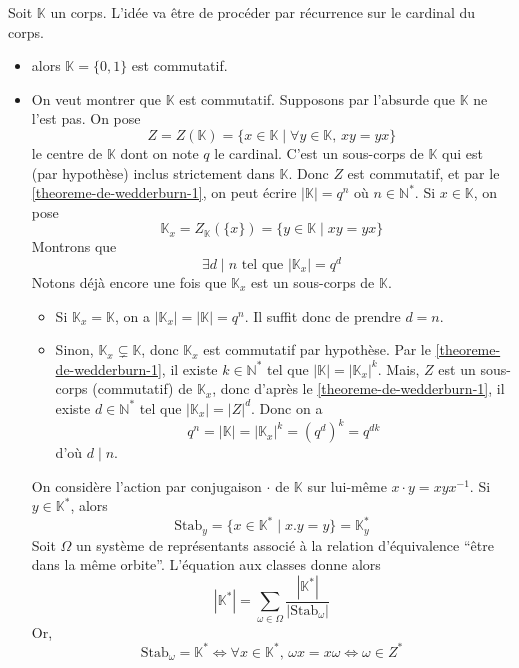 	\begin{demonstration}
		Soit $\mathbb{K}$ un corps. L'idée va être de procéder par récurrence sur le cardinal du corps.
		\begin{itemize}
			\item {} alors $\mathbb{K} = \{0, 1\}$ est commutatif.
			\item {} On veut montrer que $\mathbb{K}$ est commutatif. Supposons par l'absurde que $\mathbb{K}$ ne l'est pas. On pose
			\[ Z = Z(\mathbb{K}) = \{ x \in \mathbb{K} \mid \forall y \in \mathbb{K}, \, xy = yx \} \]
			le centre de $\mathbb{K}$ dont on note $q$ le cardinal. C'est un sous-corps de $\mathbb{K}$ qui est (par hypothèse) inclus strictement dans $\mathbb{K}$. Donc $Z$ est commutatif, et par le \cref{theoreme-de-wedderburn-1}, on peut écrire $|\mathbb{K}| = q^n$ où $n \in \mathbb{N}^*$. Si $x \in \mathbb{K}$, on pose
			\[ \mathbb{K}_x = Z_{\mathbb{K}}(\{ x \}) = \{ y \in \mathbb{K} \mid xy = yx \} \]
			Montrons que
			\[ \exists d \mid n \text{ tel que } |\mathbb{K}_x| = q^d \tag{$*$} \]
			Notons déjà encore une fois que $\mathbb{K}_x$ est un sous-corps de $\mathbb{K}$.
			\begin{itemize}
				\item Si $\mathbb{K}_x = \mathbb{K}$, on a $|\mathbb{K}_x| = |\mathbb{K}| = q^n$. Il suffit donc de prendre $d = n$.
				\item Sinon, $\mathbb{K}_x \subsetneq \mathbb{K}$, donc $\mathbb{K}_x$ est commutatif par hypothèse. Par le \cref{theoreme-de-wedderburn-1}, il existe $k \in \mathbb{N}^*$ tel que $|\mathbb{K}| = |\mathbb{K}_x|^k$.
				\newpar
				Mais, $Z$ est un sous-corps (commutatif) de $\mathbb{K}_x$, donc d'après le \cref{theoreme-de-wedderburn-1}, il existe $d \in \mathbb{N}^*$ tel que $|\mathbb{K}_x| = |Z|^d$. Donc on a
				\[ q^n = |\mathbb{K}| = |\mathbb{K}_x|^k = (q^d)^k = q^{dk} \]
				d'où $d \mid n$.
			\end{itemize}
			On considère l'action par conjugaison $\cdot$ de $\mathbb{K}$ sur lui-même $x \cdot y = xyx^{-1}$. Si $y \in \mathbb{K}^*$, alors
			\[ \mathrm{Stab}_y = \{ x \in \mathbb{K}^* \mid x.y = y \} = \mathbb{K}_y^* \]
			Soit $\Omega$ un système de représentants associé à la relation d'équivalence ``être dans la même orbite''. L'équation aux classes donne alors
			\[ |\mathbb{K}^*| = \sum_{\omega \in \Omega} \frac{|\mathbb{K}^*|}{|\mathrm{Stab}_\omega|} \]
			Or,
			\[ \mathrm{Stab}_\omega = \mathbb{K}^* \iff \forall x \in \mathbb{K}^*, \, \omega x = x \omega \iff \omega \in Z^* \]

\end{itemize}
\end{demonstration}
